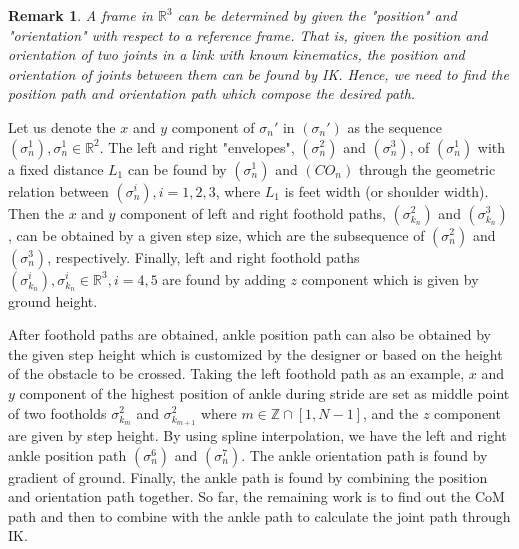 \documentclass{ieeeaccess}
\newtheorem{remark}{Remark}
\begin{document}
\begin{remark}
    A frame in $\mathbb{R}^3$ can be determined by given the "position" and "orientation" with respect to a reference frame. That is, given the position and orientation of two joints in a link with known kinematics, the position and orientation of joints between them can be found by IK. Hence, we need to find the  position path and orientation path which compose the desired path.
\end{remark}

Let us denote the $x$ and $y$ component of $\sigma_n'$ in $(\sigma_n')$ as the sequence $(\sigma^{1}_{n}), \sigma^{1}_{n}\in\mathbb{R}^2$. The left and right "envelopes", $(\sigma^{2}_{n})$ and $(\sigma^{3}_{n})$, of $(\sigma^{1}_{n})$ with a fixed distance $L_1$ can be found by $(\sigma^{1}_{n})$ and $(CO_n)$ through the geometric relation between $(\sigma^{i}_{n}), i=1,2,3$, where $L_1$ is feet width (or shoulder width). Then the $x$ and $y$ component of left and right foothold paths, $(\sigma^{2}_{k_n})$ and $(\sigma^{3}_{k_n})$, can be obtained by a given step size, which are the subsequence of $(\sigma^{2}_{n})$ and $(\sigma^{3}_{n})$, respectively. Finally, left and right foothold paths $(\sigma^{i}_{k_n}), \sigma^{i}_{k_n}\in\mathbb{R}^3, i=4,5$ are found by adding $z$ component which is given by ground height.

After foothold paths are obtained, ankle position path can also be obtained by the given step height which is customized by the designer or based on the height of the obstacle to be crossed. Taking the left foothold path as an example, $x$ and $y$ component of the highest position of ankle during stride are set as middle point of two footholds $\sigma^{2}_{k_m}$ and $\sigma^{2}_{k_{m+1}}$ where $m\in\mathbb{Z}\cap[1,N-1]$, and the $z$ component are given by step height. By using spline interpolation, we have the left and right ankle position path $(\sigma^{6}_{n})$ and $(\sigma^{7}_{n})$. The ankle orientation path is found by gradient of ground. Finally, the ankle path is found by combining the position and orientation path together. So far, the remaining work is to find out the CoM path and then to combine with the ankle path to calculate the joint path through IK.
\end{document}
